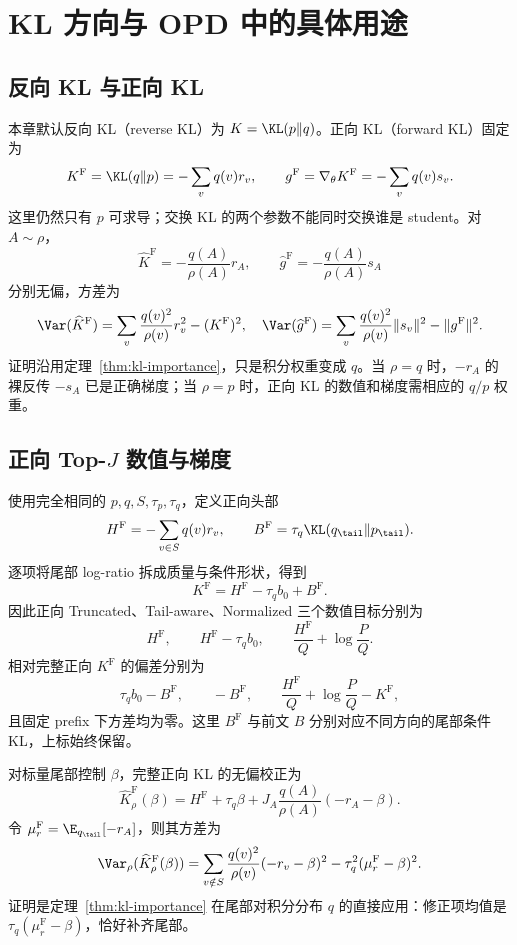 \section{KL 方向与 OPD 中的具体用途}
\label{sec:kl-opd-roles}

\subsection{反向 KL 与正向 KL}

本章默认反向 KL（reverse KL）为 $K=\KL(p\Vert q)$。正向 KL（forward KL）固定为
\[
 K^{\mathrm F}=\KL(q\Vert p)=-\sum_vq(v)r_v,\qquad
 g^{\mathrm F}=\nabla_\theta K^{\mathrm F}=-\sum_vq(v)s_v.
\]
这里仍然只有 $p$ 可求导；交换 KL 的两个参数不能同时交换谁是 student。对 $A\sim\rho$，
\[
 \widehat K^{\mathrm F}=-\frac{q(A)}{\rho(A)}r_A,\qquad
 \widehat g^{\mathrm F}=-\frac{q(A)}{\rho(A)}s_A
\]
分别无偏，方差为
\[
 \Var(\widehat K^{\mathrm F})
 =\sum_v\frac{q(v)^2}{\rho(v)}r_v^2-(K^{\mathrm F})^2,
 \quad
 \Var(\widehat g^{\mathrm F})
 =\sum_v\frac{q(v)^2}{\rho(v)}\lVert s_v\rVert^2-\lVert g^{\mathrm F}\rVert^2.
\]
证明沿用定理~\ref{thm:kl-importance}，只是积分权重变成 $q$。当 $\rho=q$ 时，$-r_A$ 的裸反传 $-s_A$ 已是正确梯度；当 $\rho=p$ 时，正向 KL 的数值和梯度需相应的 $q/p$ 权重。

\subsection{正向 Top-$J$ 数值与梯度}

使用完全相同的 $p,q,S,\tau_p,\tau_q$，定义正向头部
\[
 H^{\mathrm F}=-\sum_{v\in S}q(v)r_v,\qquad
 B^{\mathrm F}=\tau_q\KL(q_{\tail}\Vert p_{\tail}).
\]
逐项将尾部 log-ratio 拆成质量与条件形状，得到
\[
 K^{\mathrm F}=H^{\mathrm F}-\tau_qb_0+B^{\mathrm F}.
\]
因此正向 Truncated、Tail-aware、Normalized 三个数值目标分别为
\[
 H^{\mathrm F},\qquad
 H^{\mathrm F}-\tau_qb_0,\qquad
 \frac{H^{\mathrm F}}{Q}+\log\frac{P}{Q}.
\]
相对完整正向 $K^{\mathrm F}$ 的偏差分别为
\[
 \tau_qb_0-B^{\mathrm F},\qquad
 -B^{\mathrm F},\qquad
 \frac{H^{\mathrm F}}{Q}+\log\frac{P}{Q}-K^{\mathrm F},
\]
且固定 prefix 下方差均为零。这里 $B^{\mathrm F}$ 与前文 $B$ 分别对应不同方向的尾部条件 KL，上标始终保留。

对标量尾部控制 $\beta$，完整正向 KL 的无偏校正为
\[
 \widehat K^{\mathrm F}_\rho(\beta)
 =H^{\mathrm F}+\tau_q\beta
   +J_A\frac{q(A)}{\rho(A)}(-r_A-\beta).
\]
令 $\mu_r^{\mathrm F}=\E_{q_{\tail}}[-r_A]$，则其方差为
\[
 \Var_\rho(\widehat K^{\mathrm F}_\rho(\beta))
 =\sum_{v\notin S}\frac{q(v)^2}{\rho(v)}(-r_v-\beta)^2
   -\tau_q^2(\mu_r^{\mathrm F}-\beta)^2.
\]
证明是定理~\ref{thm:kl-importance} 在尾部对积分分布 $q$ 的直接应用：修正项均值是 $\tau_q(\mu_r^{\mathrm F}-\beta)$，恰好补齐尾部。


